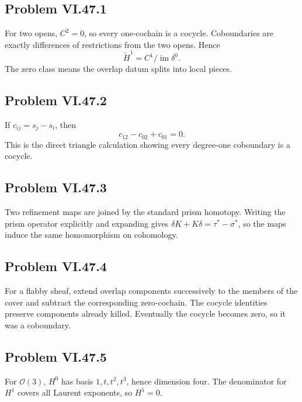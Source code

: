 \subsection*{Problem VI.47.1}
\begin{solution}
For two opens, \(C^2=0\), so every one-cochain is a cocycle.  Coboundaries are exactly differences of restrictions from the two opens.  Hence
\[
\check H^1=C^1/\operatorname{im}\delta^0.
\]
The zero class means the overlap datum splits into local pieces.
\end{solution}

\subsection*{Problem VI.47.2}
\begin{solution}
If \(c_{ij}=s_j-s_i\), then
\[
c_{12}-c_{02}+c_{01}=0.
\]
This is the direct triangle calculation showing every degree-one coboundary is a cocycle.
\end{solution}

\subsection*{Problem VI.47.3}
\begin{solution}
Two refinement maps are joined by the standard prism homotopy.  Writing the prism operator explicitly and expanding gives \(\delta K+K\delta=\tau^*-\sigma^*\), so the maps induce the same homomorphism on cohomology.
\end{solution}

\subsection*{Problem VI.47.4}
\begin{solution}
For a flabby sheaf, extend overlap components successively to the members of the cover and subtract the corresponding zero-cochain.  The cocycle identities preserve components already killed.  Eventually the cocycle becomes zero, so it was a coboundary.
\end{solution}

\subsection*{Problem VI.47.5}
\begin{solution}
For \(\mathcal O(3)\), \(H^0\) has basis \(1,t,t^2,t^3\), hence dimension four.  The denominator for \(H^1\) covers all Laurent exponents, so \(H^1=0\).
\end{solution}

